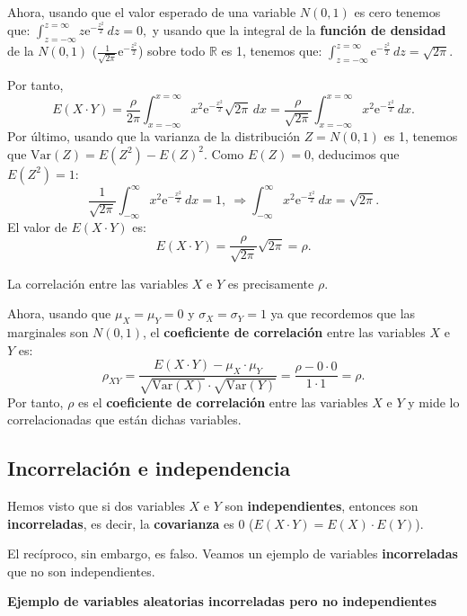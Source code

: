 \documentclass[
  letterpaper,
  DIV=11,
  numbers=noendperiod]{scrreprt}
\begin{document}
Ahora, usando que el valor esperado de una variable \(N(0,1)\) es cero
tenemos que:
\(\int_{z=-\infty}^{z=\infty} z \mathrm{e}^{-\frac{z^2}{2}}\, dz =0,\) y
usando que la integral de la \textbf{función de densidad} de la
\(N(0,1)\) (\(\frac{1}{\sqrt{2\pi}}\mathrm{e}^{-\frac{z^2}{2}}\)) sobre
todo \(\mathbb{R}\) es 1, tenemos que:
\(\int_{z=-\infty}^{z=\infty} \mathrm{e}^{-\frac{z^2}{2}}\, dz =\sqrt{2\pi}.\)

Por tanto, \[
E(X\cdot Y)=\frac{\rho}{2\pi} \int_{x=-\infty}^{x=\infty} x^2  \mathrm{e}^{-\frac{x^2}{2}}\sqrt{2\pi}\, dx=\frac{\rho}{\sqrt{2\pi}}\int_{x=-\infty}^{x=\infty} x^2  \mathrm{e}^{-\frac{x^2}{2}}\, dx.
\] Por último, usando que la varianza de la distribución \(Z=N(0,1)\) es
1, tenemos que \(\mathrm{Var}(Z)=E\left(Z^2\right)-E(Z)^2\). Como
\(E(Z)=0\), deducimos que \(E\left(Z^2\right)=1\): \[
\frac{1}{\sqrt{2\pi}}\int_{-\infty}^\infty x^2\mathrm{e}^{-\frac{x^2}{2}}\, dx=1,\ \Rightarrow \int_{-\infty}^\infty x^2\mathrm{e}^{-\frac{x^2}{2}}\, dx=\sqrt{2\pi}.
\] El valor de \(E(X\cdot Y)\) es: \[
E(X\cdot Y)=\frac{\rho}{\sqrt{2\pi}}\sqrt{2\pi}=\rho.
\]

La correlación entre las variables \(X\) e \(Y\) es precisamente
\(\rho\).

Ahora, usando que \(\mu_X=\mu_Y=0\) y \(\sigma_X=\sigma_Y=1\) ya que
recordemos que las marginales son \(N(0,1)\), el \textbf{coeficiente de
correlación} entre las variables \(X\) e \(Y\) es: \[
\rho_{XY}=\frac{E(X\cdot Y)-\mu_X\cdot \mu_Y}{\sqrt{\mathrm{Var}(X)}\cdot\sqrt{\mathrm{Var}(Y)}}=\frac{\rho-0\cdot 0}{1\cdot 1}=\rho.
\] Por tanto, \(\rho\) es el \textbf{coeficiente de correlación} entre
las variables \(X\) e \(Y\) y mide lo correlacionadas que están dichas
variables.

\hypertarget{incorrelaciuxf3n-e-independencia}{%
\subsection{Incorrelación e
independencia}\label{incorrelaciuxf3n-e-independencia}}

Hemos visto que si dos variables \(X\) e \(Y\) son
\textbf{independientes}, entonces son \textbf{incorreladas}, es decir,
la \textbf{covarianza} es 0 (\(E(X\cdot Y)=E(X)\cdot E(Y)\)).

El recíproco, sin embargo, es falso. Veamos un ejemplo de variables
\textbf{incorreladas} que no son independientes.

\textbf{Ejemplo de variables aleatorias incorreladas pero no
independientes}
\end{document}
